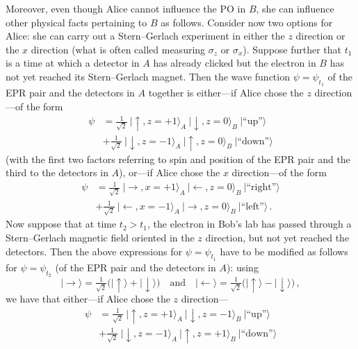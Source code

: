 \documentclass[12pt]{article}
\begin{document}
Moreover, even though Alice cannot influence the PO in $B$, she can influence other physical facts pertaining to $B$ as follows. Consider now two options for Alice: she can carry out a Stern--Gerlach experiment in either the $z$ direction or the $x$ direction (what is often called measuring $\sigma_z$ or $\sigma_x$). Suppose further that $t_1$ is a time at which a detector in $A$ has already clicked but the electron in $B$ has not yet reached its Stern--Gerlach magnet. Then the wave function $\psi=\psi_{t_1}$ of the EPR pair and the detectors in $A$ together is either---if Alice chose the $z$ direction---of the form
\begin{align}
\psi &= \nonumber
\tfrac{1}{\sqrt{2}}  \: \bigl|\uparrow,z=+1\bigr\rangle_A \:
\bigl|\downarrow,z=0 \bigr\rangle_B \: \bigl|\text{``up''}\bigr\rangle\\
&+\tfrac{1}{\sqrt{2}}  \: \bigl|\downarrow,z=-1\bigr\rangle_A \:
\bigl| \uparrow,z=0 \bigr\rangle_B \: \bigl|\text{``down''}\bigr\rangle
\end{align}
(with the first two factors referring to spin and position of the EPR pair and the third to the detectors in $A$), or---if Alice chose the $x$ direction---of the form
\begin{align}
\psi &= \nonumber
\tfrac{1}{\sqrt{2}}  \: \bigl|\rightarrow,x=+1\bigr\rangle_A \: 
\bigl|\leftarrow,z=0\bigr\rangle_B 
\: \bigl|\text{``right''}\bigr\rangle \\%
&+\tfrac{1}{\sqrt{2}}  \: \bigl|\leftarrow,x=-1\bigr\rangle_A  \: 
\bigl| \rightarrow,z=0 \bigr\rangle_B 
\: \bigl|\text{``left''}\bigr\rangle \,.
\end{align}
Now suppose that at time $t_2>t_1$, the electron in Bob's lab has passed through a Stern--Gerlach magnetic field oriented in the $z$ direction, but not yet reached the detectors. Then the above expressions for $\psi=\psi_{t_1}$ have to be modified as follows for $\psi=\psi_{t_2}$ (of the EPR pair and the detectors in $A$): using 
\begin{equation}
\bigl|\rightarrow\bigr\rangle = 
\tfrac{1}{\sqrt{2}}\bigl(\bigl|\uparrow\bigr\rangle + \bigl|\downarrow\bigr\rangle\bigr)
\quad \text{and} \quad 
\bigl|\leftarrow\bigr\rangle = 
\tfrac{1}{\sqrt{2}} \bigl(\bigl|\uparrow\bigr\rangle - \bigl|\downarrow\bigr\rangle\bigr)\,,
\end{equation}
we have that either---if Alice chose the $z$ direction---
\begin{align}
\psi &= \nonumber
\tfrac{1}{\sqrt{2}} \: \bigl|\uparrow,z=+1\bigr\rangle_A \:
\bigl|\downarrow,z=-1 \bigr\rangle_B \: \bigl|\text{``up''}\bigr\rangle \\%
&+\tfrac{1}{\sqrt{2}}  \: \bigl|\downarrow,z=-1\bigr\rangle_A \:
\bigl| \uparrow,z=+1 \bigr\rangle_B \: \bigl|\text{``down''}\bigr\rangle 
\end{align}
\end{document}
